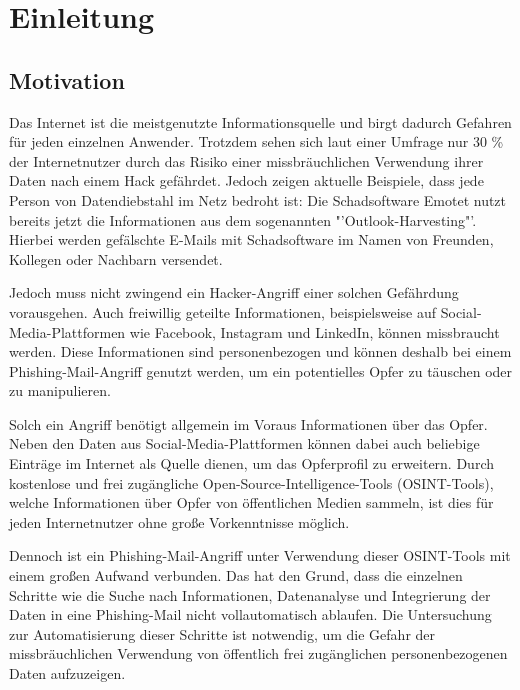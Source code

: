 \chapter{Einleitung}
\label{cha:einleitung}

\section{Motivation}
Das Internet ist die meistgenutzte Informationsquelle und birgt dadurch Gefahren für jeden einzelnen Anwender.  \cite{Inforamtionsquellen} Trotzdem sehen sich laut einer Umfrage nur 30 \% der Internetnutzer durch das Risiko einer missbräuchlichen Verwendung ihrer Daten nach einem Hack gefährdet. \cite{AngstDatendiebstahl} Jedoch zeigen aktuelle Beispiele, dass jede Person von Datendiebstahl im Netz bedroht ist: Die Schadsoftware Emotet nutzt bereits jetzt die Informationen aus dem sogenannten "'Outlook-Harvesting"'. Hierbei werden gefälschte E-Mails mit Schadsoftware im Namen von Freunden, Kollegen oder Nachbarn versendet. \cite{bsiEmotet}

Jedoch muss nicht zwingend ein Hacker-Angriff einer solchen Gefährdung vorausgehen. Auch freiwillig geteilte Informationen, beispielsweise auf Social-Media-Plattformen wie Facebook, Instagram und LinkedIn, können missbraucht werden. Diese Informationen sind personenbezogen und können deshalb bei einem Phishing-Mail-Angriff genutzt werden, um ein potentielles Opfer zu täuschen oder zu manipulieren.

Solch ein Angriff benötigt allgemein im Voraus Informationen über das Opfer.  Neben den Daten aus Social-Media-Plattformen können dabei auch beliebige Einträge im Internet als Quelle dienen, um das Opferprofil zu erweitern. Durch kostenlose und frei zugängliche Open-Source-Intelligence-Tools (OSINT-Tools), welche Informationen über Opfer von öffentlichen Medien sammeln, ist dies für jeden Internetnutzer ohne große Vorkenntnisse möglich. 

Dennoch ist ein Phishing-Mail-Angriff unter Verwendung dieser OSINT-Tools mit einem großen Aufwand verbunden. Das hat den Grund, dass die einzelnen Schritte wie die Suche nach Informationen, Datenanalyse und Integrierung der Daten in eine Phishing-Mail nicht vollautomatisch ablaufen. Die Untersuchung zur Automatisierung dieser Schritte ist notwendig, um die Gefahr der missbräuchlichen Verwendung von öffentlich frei zugänglichen personenbezogenen Daten aufzuzeigen.

